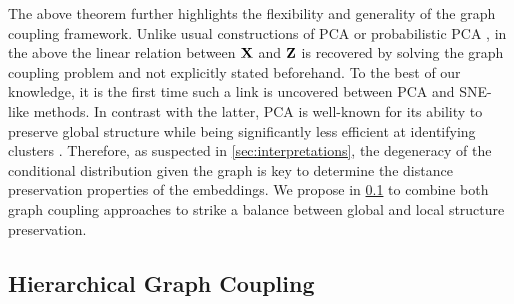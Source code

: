 The above theorem further highlights the flexibility and generality of the graph coupling framework. Unlike usual constructions of PCA or probabilistic PCA \cite{tipping1999probabilistic}, in the above the linear relation between $\mathbf{X}$ and $\mathbf{Z}$ is recovered by solving the graph coupling problem and not explicitly stated beforehand. To the best of our knowledge, it is the first time such a link is uncovered between PCA and SNE-like methods. In contrast with the latter, PCA is well-known for its ability to preserve global structure while being significantly less efficient at identifying clusters \cite{anowar2021conceptual}. Therefore, as suspected in \cref{sec:interpretations}, the degeneracy of the conditional distribution given the graph is key to determine the distance preservation properties of the embeddings. We propose in \cref{sec:hierarchical_modelling} to combine both graph coupling approaches to strike a balance between global and local structure preservation.


\subsection{Hierarchical Graph Coupling}\label{sec:hierarchical_modelling}

